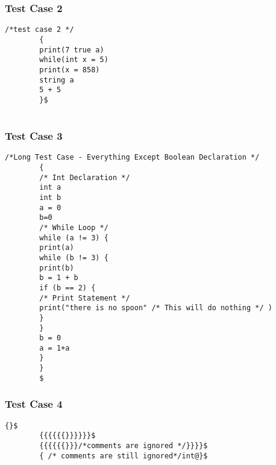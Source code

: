 \documentclass[letterpaper, 10pt,DIV=13]{scrartcl}
\numberwithin{equation}{section} %
\numberwithin{figure}{section} %
\numberwithin{table}{section} %
\begin{document}
\subsubsection*{Test Case 2}
    \lstset{numbers=left, numberstyle=\tiny, stepnumber=1, numbersep=5pt, basicstyle=\footnotesize\ttfamily}
    \begin{lstlisting}[frame=single, ]
        /*test case 2 */
        {
        print(7 true a)
        while(int x = 5)
        print(x = 858)
        string a
        5 + 5
        }$
        
    \end{lstlisting}

\subsubsection*{Test Case 3}
    \lstset{numbers=left, numberstyle=\tiny, stepnumber=1, numbersep=5pt, basicstyle=\footnotesize\ttfamily}
    \begin{lstlisting}[frame=single, ]
        /*Long Test Case - Everything Except Boolean Declaration */
        {
        /* Int Declaration */
        int a
        int b
        a = 0
        b=0
        /* While Loop */
        while (a != 3) {
        print(a)
        while (b != 3) {
        print(b)
        b = 1 + b
        if (b == 2) {
        /* Print Statement */
        print("there is no spoon" /* This will do nothing */ )
        }
        }
        b = 0
        a = 1+a
        }
        }
        $
    \end{lstlisting}

\subsubsection*{Test Case 4}
    \lstset{numbers=left, numberstyle=\tiny, stepnumber=1, numbersep=5pt, basicstyle=\footnotesize\ttfamily}
    \begin{lstlisting}[frame=single, ]
        {}$
        {{{{{{}}}}}}$
        {{{{{{}}}/*comments	are	ignored	*/}}}}$
        { /* comments are still ignored*/int@}$
    \end{lstlisting}



\pagebreak

\end{document}
